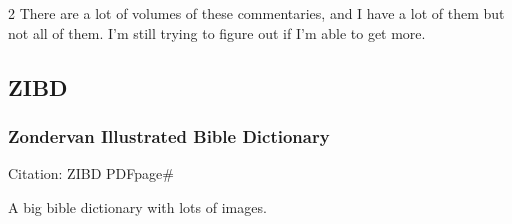 \begin{multicols}{2}
			There are a lot of volumes of these commentaries, and I have a lot of them but not all of them. I'm still trying to figure out if I'm able to get more.
		
	\subsection*{ZIBD}
	
		\subsubsection*{Zondervan Illustrated Bible Dictionary}
		
			Citation:
				ZIBD PDFpage\#
				
			A big bible dictionary with lots of images.
		
\end{multicols}
		
	
\pagebreak{}
